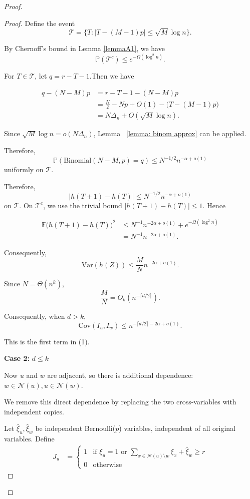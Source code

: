 \documentclass[reqno,11pt]{amsart}
\renewcommand{\le}{\leqslant}
\renewcommand{\leq}{\leqslant}
\renewcommand{\ge}{\geqslant}
\begin{document}
\begin{proof}
\begin{proof}
Define the event $$\mathcal{T}= \{T: |T-(M-1)p|\le \sqrt{M} \log n
\}.$$

By Chernoff’s bound in Lemma \ref{lemmaA1}, we have 
$$\mathbb P(\mathcal{T}^c) \le e^{-\Omega(\log^2 n)}.$$

For $T\in\mathcal{T}$, let $q=r-T-1$.Then we have 

\begin{align*}
q-(N-M)p
&= r-T-1-(N-M)p\\
&= \frac{N}{2}-Np+O(1)
-\bigl(T-(M-1)p\bigr)\\
&=N\Delta_n +O(\sqrt M\log n).
\end{align*}

Since $\sqrt{M}\log n=o(N\Delta_n)$, Lemma ~\ref{lemma: binom approx} can be applied. 


Therefore,
$$\mathbb P\left( \text{Binomial}(N-M,p)=q \right)
\le
N^{-1/2}n^{-\alpha+o(1)}$$
uniformly on $\mathcal{T}$.

Therefore, 
$$|h(T+1)-h(T)|
\le
N^{-1/2}n^{-\alpha+o(1)}
$$
on $\mathcal T$. On $\mathcal T^c$, we use the trivial bound $|h(T+1)-h(T)|\le1$. Hence

\begin{align*}
\mathbb E
\bigl(h(T+1)-h(T)\bigr)^2
&\le
N^{-1}n^{-2\alpha+o(1)}
+
e^{-\Omega(\log^2 n)}\\
&=
N^{-1}n^{-2\alpha+o(1)}.
\end{align*}

Consequently, 
$$\text{Var}(h(Z)) \le \frac{M}{N}n^{-2\alpha+o(1)}.$$


Since $N=\Theta(n^k)$,
$$\frac {M}{N} =O_k\left(n^{-\lceil d/2\rceil}\right).$$


Consequently, when $d>k$, 
$$
\text{Cov}(I_u,I_w)
\le
n^{-\lceil d/2\rceil-2\alpha+o(1)}.$$

This is the first term in (1).

\textbf{Case 2:} $d\leq k$

Now $u$ and $w$ are adjacent, so there is additional dependence:
$
w\in \mathcal{N}(u), u\in \mathcal{N}(w).
$

We remove this direct dependence by replacing the two cross-variables with independent copies.

Let $\widehat\xi_u,\widehat\xi_w$ be independent Bernoulli($p$) variables, independent of all original variables. Define
\begin{align*}
J_u &= 
\begin{cases}
1 & \text{if 
$\xi_u=1$ or 
$\sum_{x \in \mathcal{N}(u) \setminus w}\xi_x
+\widehat\xi_w
\ge r$} \\
0 & \text{otherwise}
\end{cases}
\end{align*}


\end{proof}
\end{proof}
\end{document}
